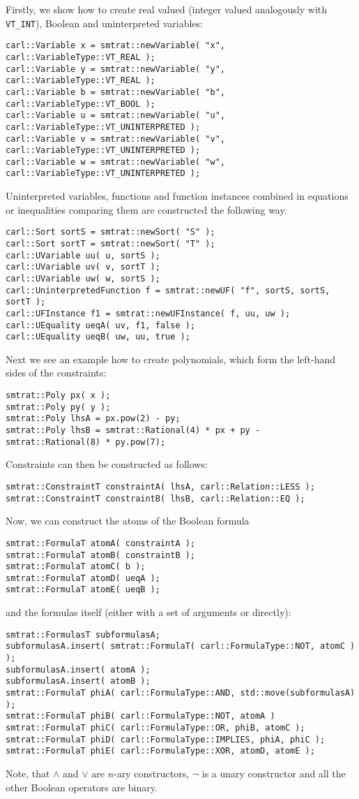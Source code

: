 Firstly, we show how to create real valued (integer valued analogously with \texttt{VT\_INT}), Boolean and uninterpreted variables:
\scriptsize
\begin{verbatim}
carl::Variable x = smtrat::newVariable( "x", carl::VariableType::VT_REAL );
carl::Variable y = smtrat::newVariable( "y", carl::VariableType::VT_REAL );
carl::Variable b = smtrat::newVariable( "b", carl::VariableType::VT_BOOL );
carl::Variable u = smtrat::newVariable( "u", carl::VariableType::VT_UNINTERPRETED );
carl::Variable v = smtrat::newVariable( "v", carl::VariableType::VT_UNINTERPRETED );
carl::Variable w = smtrat::newVariable( "w", carl::VariableType::VT_UNINTERPRETED );
\end{verbatim}
\normalsize
Uninterpreted variables, functions and function instances combined in equations or inequalities comparing them are constructed the following way.
\scriptsize
\begin{verbatim}
carl::Sort sortS = smtrat::newSort( "S" );
carl::Sort sortT = smtrat::newSort( "T" );
carl::UVariable uu( u, sortS );
carl::UVariable uv( v, sortT );
carl::UVariable uw( w, sortS );
carl::UninterpretedFunction f = smtrat::newUF( "f", sortS, sortS, sortT );
carl::UFInstance f1 = smtrat::newUFInstance( f, uu, uw );
carl::UEquality ueqA( uv, f1, false );
carl::UEquality ueqB( uw, uu, true );
\end{verbatim}
\normalsize
Next we see an example how to create polynomials, which form the left-hand sides of the constraints:
\scriptsize
\begin{verbatim}
smtrat::Poly px( x );
smtrat::Poly py( y );
smtrat::Poly lhsA = px.pow(2) - py;
smtrat::Poly lhsB = smtrat::Rational(4) * px + py - smtrat::Rational(8) * py.pow(7);
\end{verbatim}
\normalsize
Constraints can then be constructed as follows:
\scriptsize
\begin{verbatim}
smtrat::ConstraintT constraintA( lhsA, carl::Relation::LESS );
smtrat::ConstraintT constraintB( lhsB, carl::Relation::EQ );
\end{verbatim}
\normalsize
Now, we can construct the atoms of the Boolean formula
\scriptsize
\begin{verbatim}
smtrat::FormulaT atomA( constraintA );
smtrat::FormulaT atomB( constraintB );
smtrat::FormulaT atomC( b );
smtrat::FormulaT atomD( ueqA );
smtrat::FormulaT atomE( ueqB );
\end{verbatim}
\normalsize
and the formulas itself (either with a set of arguments or directly):
\scriptsize
\begin{verbatim}
smtrat::FormulasT subformulasA;
subformulasA.insert( smtrat::FormulaT( carl::FormulaType::NOT, atomC ) );
subformulasA.insert( atomA );
subformulasA.insert( atomB );
smtrat::FormulaT phiA( carl::FormulaType::AND, std::move(subformulasA) );
smtrat::FormulaT phiB( carl::FormulaType::NOT, atomA )
smtrat::FormulaT phiC( carl::FormulaType::OR, phiB, atomC );
smtrat::FormulaT phiD( carl::FormulaType::IMPLIES, phiA, phiC );
smtrat::FormulaT phiE( carl::FormulaType::XOR, atomD, atomE );
\end{verbatim}
\normalsize
Note, that $\land$ and $\lor$ are $n$-ary constructors, $\neg$ is a unary constructor and all the other Boolean operators are binary.

